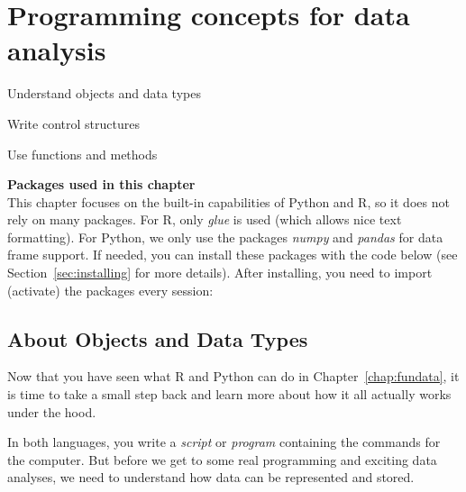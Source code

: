 \chapter{Programming concepts for data analysis}
\label{chap:programmingconcepts}

\begin{abstract}{Abstract}
  This chapter introduces readers to the basics of programming
  in Python and R. It
explains how to deal with objects, statements, expressions, variables
and different types of data, and shows how to create and understand
simple control structures such as loops and conditions.
\end{abstract}


\begin{objectives}
\item Understand objects and data types
\item Write control structures
\item Use functions and methods
\end{objectives}

\newpage
\begin{feature}
  \textbf{Packages used in this chapter}\\
  This chapter focuses on the built-in capabilities of Python and R,
  so it does not rely on many packages.
  For R, only \emph{glue} is used (which allows nice text formatting).
  For Python, we only use the packages \emph{numpy} and \emph{pandas}
  for data frame support.
  If needed, you can install these packages with the code below
  (see Section~\ref{sec:installing} for more details).
  \noindent After installing, you need to import (activate) the packages every session:
\end{feature}


\section{About Objects and Data Types}
\label{sec:datatypes}

Now that you have seen what R and Python can do in Chapter~\ref{chap:fundata},
it is time to take a small step back and learn more about how it all actually works under the hood.

In both languages, you write a
\emph{script} or \emph{program} containing the commands for the
computer.  But before we get to
some real programming and exciting data analyses, we need to understand
how data can be represented and stored.

